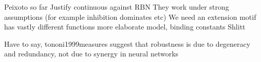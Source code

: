 \documentclass[../main.tex]{subfiles}
\begin{document}
Peixoto so far
Justify continuous against RBN
They work under strong assumptions (for example inhibition dominates etc) \cite{}
We need an extension
motif has vastly different functions \cite{ingram2006network}
more elaborate model, binding constants	\cite{ingram2006network}
Shlitt

Have to say, tononi1999measures suggest that robustness is due to degeneracy and redundancy, not due to synergy in neural networks
\end{document}
